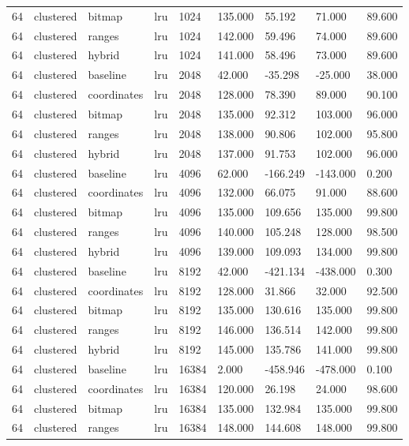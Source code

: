 \begin{tabular}{lllllllll}
64 & clustered & bitmap & lru & 1024 & 135.000 & 55.192 & 71.000 & 89.600 \\
64 & clustered & ranges & lru & 1024 & 142.000 & 59.496 & 74.000 & 89.600 \\
64 & clustered & hybrid & lru & 1024 & 141.000 & 58.496 & 73.000 & 89.600 \\
64 & clustered & baseline & lru & 2048 & 42.000 & -35.298 & -25.000 & 38.000 \\
64 & clustered & coordinates & lru & 2048 & 128.000 & 78.390 & 89.000 & 90.100 \\
64 & clustered & bitmap & lru & 2048 & 135.000 & 92.312 & 103.000 & 96.000 \\
64 & clustered & ranges & lru & 2048 & 138.000 & 90.806 & 102.000 & 95.800 \\
64 & clustered & hybrid & lru & 2048 & 137.000 & 91.753 & 102.000 & 96.000 \\
64 & clustered & baseline & lru & 4096 & 62.000 & -166.249 & -143.000 & 0.200 \\
64 & clustered & coordinates & lru & 4096 & 132.000 & 66.075 & 91.000 & 88.600 \\
64 & clustered & bitmap & lru & 4096 & 135.000 & 109.656 & 135.000 & 99.800 \\
64 & clustered & ranges & lru & 4096 & 140.000 & 105.248 & 128.000 & 98.500 \\
64 & clustered & hybrid & lru & 4096 & 139.000 & 109.093 & 134.000 & 99.800 \\
64 & clustered & baseline & lru & 8192 & 42.000 & -421.134 & -438.000 & 0.300 \\
64 & clustered & coordinates & lru & 8192 & 128.000 & 31.866 & 32.000 & 92.500 \\
64 & clustered & bitmap & lru & 8192 & 135.000 & 130.616 & 135.000 & 99.800 \\
64 & clustered & ranges & lru & 8192 & 146.000 & 136.514 & 142.000 & 99.800 \\
64 & clustered & hybrid & lru & 8192 & 145.000 & 135.786 & 141.000 & 99.800 \\
64 & clustered & baseline & lru & 16384 & 2.000 & -458.946 & -478.000 & 0.100 \\
64 & clustered & coordinates & lru & 16384 & 120.000 & 26.198 & 24.000 & 98.600 \\
64 & clustered & bitmap & lru & 16384 & 135.000 & 132.984 & 135.000 & 99.800 \\
64 & clustered & ranges & lru & 16384 & 148.000 & 144.608 & 148.000 & 99.800 \\

\end{tabular}
